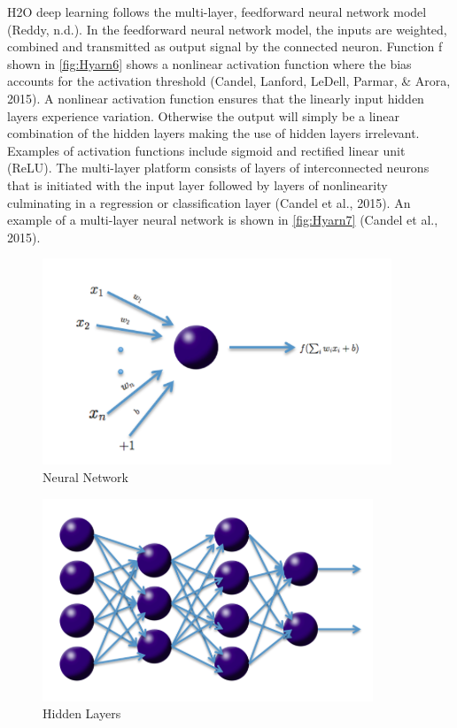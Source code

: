 \documentclass[12pt,twoside]{amherstthesis}
\begin{document}
  H2O deep learning follows the multi-layer, feedforward neural network
  model (Reddy, n.d.). In the feedforward neural network model, the inputs
  are weighted, combined and transmitted as output signal by the connected
  neuron. Function f shown in \autoref{fig:Hyarn6} shows a nonlinear
  activation function where the bias accounts for the activation threshold
  (Candel, Lanford, LeDell, Parmar, \& Arora, 2015). A nonlinear
  activation function ensures that the linearly input hidden layers
  experience variation. Otherwise the output will simply be a linear
  combination of the hidden layers making the use of hidden layers
  irrelevant. Examples of activation functions include sigmoid and
  rectified linear unit (ReLU). The multi-layer platform consists of
  layers of interconnected neurons that is initiated with the input layer
  followed by layers of nonlinearity culminating in a regression or
  classification layer (Candel et al., 2015). An example of a multi-layer
  neural network is shown in \autoref{fig:Hyarn7} (Candel et al., 2015).
  
  \begin{figure}[htbp]
  \centering
  \includegraphics[scale = 0.9,angle = 0]{figure/neuralNet.png}
  \caption[Neural Network]{\normalsize{Neural Network}}
  \label{fig:Hyarn6}
  \end{figure}
  
  \begin{figure}[htbp]
  \centering
  \includegraphics[scale = 0.5,angle = 0]{figure/neuralHid.png}
  \caption[Hidden Layers]{\normalsize{Hidden Layers}}
  \label{fig:Hyarn7}
  \end{figure}
  
\end{document}
